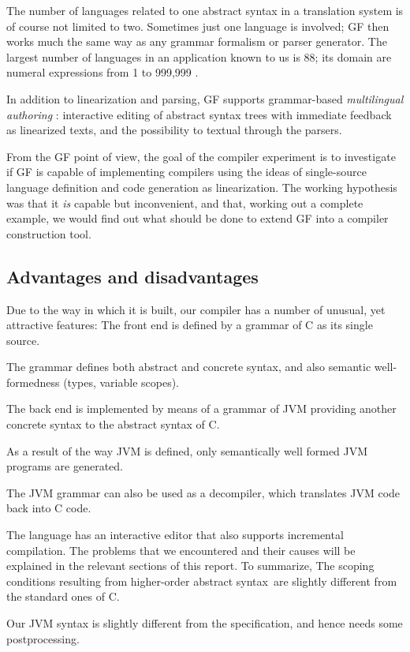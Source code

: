 \documentclass[12pt]{article}
\newcommand{\HOAS}{higher-order abstract syntax}
\newcommand{\empha}[1]{{\em #1}}
\begin{document}
The number of languages related to one abstract syntax in
a translation system is of course not limited to two. 
Sometimes just one language is involved; 
GF then works much the same way as any grammar 
formalism or parser generator. 
The largest number of languages in an application known to us is 88;
its domain are numeral expressions from 1 to 999,999 \cite{gf-homepage}.

In addition to linearization and parsing, GF supports grammar-based
\empha{multilingual authoring} \cite{khegai}: interactive editing
of abstract syntax trees with immediate feedback as linearized texts,
and the possibility to textual through the parsers. 
 
From the GF point of view, the goal of the compiler experiment
is to investigate if GF is capable of implementing
compilers using the ideas of single-source language definition
and code generation as linearization. The working hypothesis
was that it \textit{is} capable but inconvenient, and that,
working out a complete example, we would find out what 
should be done to extend GF into a compiler construction tool.


\subsection{Advantages and disadvantages}

Due to the way in which it is built, our compiler has
a number of unusual, yet attractive features:
\bequ
The front end is defined by a grammar of C as its single source.

The grammar defines both abstract and concrete syntax, and also
semantic well-formedness (types, variable scopes).

The back end is implemented by means of a grammar of JVM providing
another concrete syntax to the abstract syntax of C.

As a result of the way JVM is defined, only semantically well formed
JVM programs are generated.

The JVM grammar can also be used as a decompiler, which translates
JVM code back into C code.

The language has an interactive editor that also supports incremental
compilation.
\enqu
The problems that we encountered and their causes will be explained in 
the relevant sections of this report. To summarize,
\bequ
The scoping conditions resulting from \HOAS\ are slightly different
from the standard ones of C.

Our JVM syntax is slightly different from the specification, and
hence needs some postprocessing.
\end{document}
